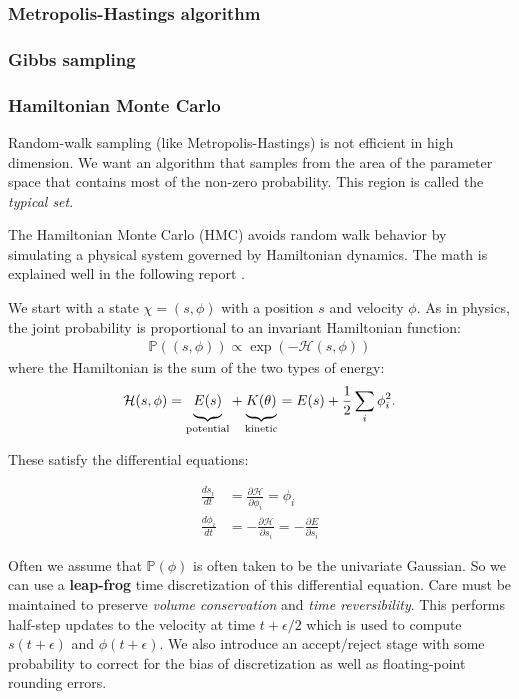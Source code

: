 \documentclass[12pt]{article}
\newcommand{\mystrut}{\ensuremath{\vphantom{\sum}}}
\newcommand{\PP}{\ensuremath{\mathbb{P}}}
\begin{document}
\subsubsection{Metropolis-Hastings algorithm}

\subsubsection{Gibbs sampling}

\subsubsection{Hamiltonian Monte Carlo}

Random-walk sampling (like Metropolis-Hastings) is not efficient in high
dimension. We want an algorithm that samples from the area of the
parameter space that contains most of the non-zero probability. This region is
called the {\sl typical set}.

The Hamiltonian Monte Carlo (HMC) avoids random walk behavior by simulating a
physical system governed by Hamiltonian dynamics. The math is explained well in
the following report \cite{Neal93probabilisticinference}.

We start with a state $\chi = (s,\phi)$ with a position $s$ and velocity $\phi$.
As in physics, the joint probability is proportional to an invariant Hamiltonian
function:
\begin{align*}
  \PP((s,\phi)) \propto \exp( -\mathcal{H}(s,\phi))
\end{align*}
where the Hamiltonian is the sum of the two types of energy:
\begin{align*}
  \mathcal H(s,\phi) = \underbrace{\mystrut E(s)}_{\text{potential}} +
  \underbrace{\mystrut K(\theta)}_{\text{kinetic}} = E(s) + \frac{1}{2} \sum_i \phi_i^2.
\end{align*}

These satisfy the differential equations:

\begin{align*}\frac{ds_i}{dt} &= \frac{\partial \mathcal{H}}{\partial \phi_i} = \phi_i \\
\frac{d\phi_i}{dt} &= - \frac{\partial \mathcal{H}}{\partial s_i}
= - \frac{\partial E}{\partial s_i}
\end{align*}

Often we assume that $\PP(\phi)$ is often taken to be the univariate Gaussian. So
we can use a {\bf leap-frog} time discretization of this differential equation.
Care must be maintained to preserve {\sl volume conservation} and {\sl time
  reversibility}. This performs half-step updates to the velocity at time
$t+\epsilon/2$ which is used to compute $s(t+\epsilon)$ and $\phi(t+\epsilon)$.
We also introduce an accept/reject stage with some probability to correct for
the bias of discretization as well as floating-point rounding errors.
\end{document}
